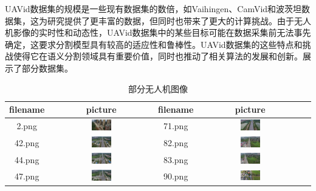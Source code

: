 UAVid数据集的规模是一些现有数据集的数倍，如Vaihingen、CamVid和波茨坦数据集，这为研究提供了更丰富的数据，但同时也带来了更大的计算挑战。由于无人机影像的实时性和动态性，UAVid数据集中的某些目标可能在数据采集前无法事先确定，这要求分割模型具有较高的适应性和鲁棒性。UAVid数据集的这些特点和挑战使得它在语义分割领域具有重要价值，同时也推动了相关算法的发展和创新。展示了部分数据集。

\begin{table}[htbp]
    \centering
    \caption{部分无人机图像}
      \begin{tabular}{ccccc}
        \toprule
        filename & picture  & filename  & picture \\
        \midrule
        2.png & \includegraphics[width=0.2\textwidth]{pic/raw/2.png} & 71.png & \includegraphics[width=0.2\textwidth]{pic/raw/71.png} \\
        42.png & \includegraphics[width=0.2\textwidth]{pic/raw/42.png} & 82.png & \includegraphics[width=0.2\textwidth]{pic/raw/82.png} \\
        44.png & \includegraphics[width=0.2\textwidth]{pic/raw/44.png} & 83.png & \includegraphics[width=0.2\textwidth]{pic/raw/83.png} \\
        47.png & \includegraphics[width=0.2\textwidth]{pic/raw/47.png} & 90.png & \includegraphics[width=0.2\textwidth]{pic/raw/90.png} \\

\end{tabular}
\end{table}
